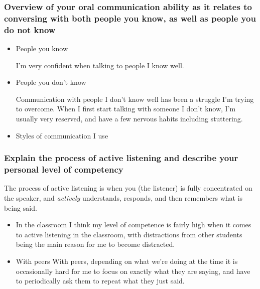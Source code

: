 \documentclass[11pt]{article}
\begin{document}
\subsubsection*{Overview of your oral communication ability as it relates to conversing with both people you know, as well as people you do not know}
\label{sec:org6011807}
\begin{itemize}
\item People you know
\label{sec:orgf6779c5}

I'm very confident when talking to people I know well.

\item People you don't know
\label{sec:orgb04de7b}

Communication with people I don't know well has been a struggle I'm trying to overcome. When I first start talking with someone I don't know, I'm usually very reserved, and have a few nervous habits including stuttering.

\item Styles of communication I use
\label{sec:orgb126d6d}
\end{itemize}
\subsubsection*{Explain the process of active listening and describe your personal level of competency}
\label{sec:org38a61ae}
The process of active listening is when you (the listener) is fully concentrated on the speaker, and \emph{actively} understands, responds, and then remembers what is being said. 
\begin{itemize}
\item In the classroom
\label{sec:orga9687f8}
I think my level of competence is fairly high when it comes to active listening in the classroom, with distractions from other students being the main reason for me to become distracted.
\item With peers
\label{sec:org641b423}
With peers, depending on what we're doing at the time it is occasionally hard for me to focus on exactly what they are saying, and have to periodically ask them to repeat what they just said.
\end{itemize}
\end{document}
